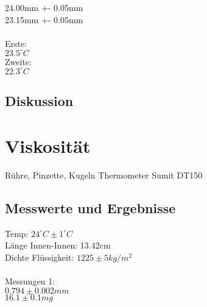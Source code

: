 \documentclass[12pt,a4paper]{article}
\begin{document}
\begin{multicols}{2}


24.00mm +- 0.05mm\\
23.15mm +- 0.05mm\\
\\
Erste:\\
$23.5^{\circ}C$\\
Zweite:\\
$22.3^{\circ}C$\\
\subsection{Diskussion}


\section{Viskosität}
Rühre, Pinzette, Kugeln
Thermometer Sumit DT150\\
\subsection{Messwerte und Ergebnisse}
Temp: $24^{\circ}C \pm 1^{\circ}C$\\
Länge Innen-Innen: 13.42cm\\
Dichte Flüssigkeit: $1225 \pm 5 kg/m^2$\\
\\
Messungen 1:\\
$0.794 \pm 0.002mm$\\
$16.1 \pm 0.1 mg$\\


\end{multicols}
\end{document}
